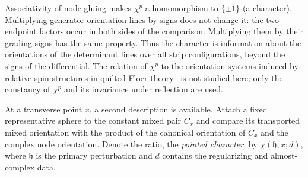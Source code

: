\documentclass[11pt]{amsart}
\theoremstyle{definition}
\theoremstyle{remark}
\theoremstyle{plain}
\numberwithin{equation}{section}
\begin{document}
Associativity of node gluing makes $\chi^p$ a homomorphism to
$\{\pm1\}$ (a character).
Multiplying generator orientation lines by signs does not change
it: the two endpoint factors occur in both sides of
the comparison. Multiplying them by their grading
signs has the same property. Thus the character is
information about the orientations of the determinant
lines over all strip configurations, beyond the signs
of the differential. The relation of $\chi^p$ to the
orientation systems induced by relative spin structures in
quilted Floer theory~\cite{WW-orientations} is not studied
here; only the constancy of $\chi^p$ and its invariance under
reflection are used.

At a transverse point $x$, a second description is
available. Attach a fixed representative sphere to
the constant mixed pair $C_x$ and compare its
transported mixed orientation with the product of
the canonical orientation of $C_x$ and the complex
node orientation. Denote the ratio, the \emph{pointed
character}, by $\chi(\mathfrak h,x;d)$, where $\mathfrak h$ is the
primary perturbation and $d$ contains the
regularizing and almost-complex data.
\end{document}

